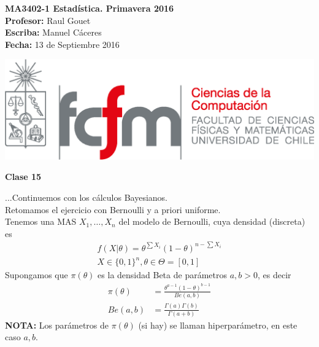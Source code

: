 \documentclass[10pt]{article}
\theoremstyle{plain}
\theoremstyle{definition}
\newcommand{\catnum}{15} %
\newcommand{\fecha}{13 de Septiembre 2016 }
\begin{document}
\vspace*{-1.2 cm}
\begin{minipage}{0.6\textwidth}
\begin{flushleft}
\hspace*{-0.5cm}\textbf{MA3402-1 Estadística. Primavera 2016}\\
\hspace*{-0.5cm}\textbf{Profesor:} Raul Gouet\\
\hspace*{-0.5cm}\textbf{Escriba:} Manuel Cáceres\\
\hspace*{-0.5cm}\textbf{Fecha:} \fecha
\end{flushleft}
\end{minipage}
\begin{minipage}{0.36\textwidth}
\begin{flushright}
\includegraphics[scale=0.3]{imagenes/fcfm_dcc}
\end{flushright}
\end{minipage}
\bigskip

\begin{center}
\LARGE\textbf{Clase \catnum}
\end{center}
...Continuemos con los cálculos Bayesianos.\\

Retomamos el ejercicio con Bernoulli y a priori uniforme.\\

Tenemos una MAS $X_{1},\ldots,X_{n}$ del modelo de Bernoulli, cuya densidad (discreta) es 
\begin{align*}
f(X|\theta) = \theta^{\sum X_{i}}(1-\theta)^{n-\sum X_{i}}\\
X\in \{0,1\}^n, \theta \in \Theta = [0,1]
\end{align*}
Supongamos que $\pi(\theta)$ es la densidad Beta de parámetros $a,b>0$, es decir
\begin{align*}
\pi(\theta) &= \frac{\theta^{a-1}(1-\theta)^{b-1}}{Be(a,b)}\\
Be(a,b) &= \frac{\Gamma(a)\Gamma(b)}{\Gamma(a+b)}
\end{align*}
\textbf{NOTA:} Los parámetros de $\pi(\theta)$ (si hay) se llaman hiperparámetro, en este caso $a,b$.\\
\end{document}
